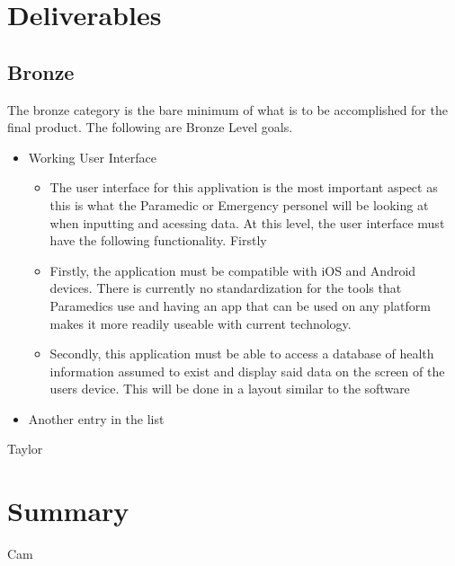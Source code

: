 \documentclass{article}
\begin{document}
\iffalse
have been conservative in our deliverable estimates, and will be having weekly meetings in order to guage the progress of development as we go along. This will allow us to remove, or add features to the software depending on the availability of time.




------------------

Random stuff :P ignore:

As of now, there is no centralized health record that contains the cumulative health information of Ontario residents.

We are developing software based on the assumption, that in the future, this information will need to be collected, and we will brainstorm the best methods by which to aggregate this information. The software being built is focused on how to handle the information and present the information, vs how the information is inputed into the system

It is assuming that we are not focused on how to input the information, so much as how to handle and present the information to the correct user.

It is assumed that the information required for this system is not available today

\fi

\section{Deliverables}
\subsection{Bronze}
The bronze category is the bare minimum of what is to be accomplished for the final product. The following are Bronze Level goals.
\begin{itemize}
  \item Working User Interface
	\begin{itemize}
	\item The user interface for this applivation is the most important aspect as this is what the Paramedic or Emergency personel will be looking at when inputting and acessing data. At this level, the user interface must have the following functionality. Firstly
	\item Firstly, the application must be compatible with iOS and Android devices. There is currently no standardization for the tools that Paramedics use and having an app that can be used on any platform makes it more readily useable with current technology.
	\item Secondly, this application must be able to access a database of health information assumed to exist and display said data on the screen of the users device. This will be done in a layout similar to the software
	\end{itemize}
  \item Another entry in the list
\end{itemize}
Taylor
\section{Summary}
Cam
\end{document}
